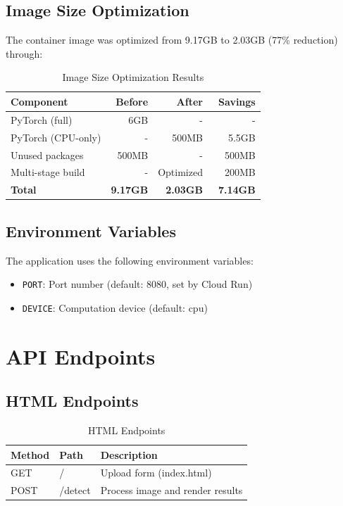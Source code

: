 \documentclass[12pt,a4paper]{article}
\begin{document}
\subsection{Image Size Optimization}
The container image was optimized from 9.17GB to 2.03GB (77\% reduction) through:
\begin{table}[H]
\centering
\begin{tabular}{lrrr}
\toprule
\textbf{Component} & \textbf{Before} & \textbf{After} & \textbf{Savings} \\
\midrule
PyTorch (full) & ~6GB & - & - \\
PyTorch (CPU-only) & - & ~500MB & ~5.5GB \\
Unused packages & ~500MB & - & ~500MB \\
Multi-stage build & - & Optimized & ~200MB \\
\textbf{Total} & \textbf{9.17GB} & \textbf{2.03GB} & \textbf{~7.14GB} \\
\bottomrule
\end{tabular}
\caption{Image Size Optimization Results}
\end{table}

\subsection{Environment Variables}
The application uses the following environment variables:
\begin{itemize}
    \item \texttt{PORT}: Port number (default: 8080, set by Cloud Run)
    \item \texttt{DEVICE}: Computation device (default: cpu)
\end{itemize}

\section{API Endpoints}

\subsection{HTML Endpoints}
\begin{table}[H]
\centering
\begin{tabular}{lll}
\toprule
\textbf{Method} & \textbf{Path} & \textbf{Description} \\
\midrule
GET & / & Upload form (index.html) \\
POST & /detect & Process image and render results \\
\bottomrule
\end{tabular}
\caption{HTML Endpoints}
\end{table}
\end{document}
